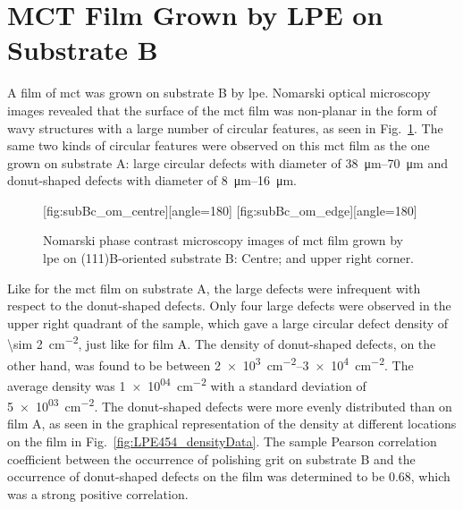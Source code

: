 \clearpage
\section{MCT Film Grown by LPE on Substrate B}\label{sec:subBc}

A film of \ac{mct} was grown on substrate B by \ac{lpe}. Nomarski optical microscopy images revealed that the surface of the \ac{mct} film was non-planar in the form of wavy structures with a large number of circular features, as seen in Fig.~\ref{fig:subBc_om}. The same two kinds of circular features were observed on this \ac{mct} film as the one grown on substrate A: large circular defects with diameter of \SIrange{38}{70}{\micro\metre} and donut-shaped defects with diameter of \SIrange{8}{16}{\micro\metre}.

\begin{figure}[htbp]
    \centering
    [fig:subBc_om_centre][angle=180]
    \hfill
    [fig:subBc_om_edge][angle=180]
    \caption[Nomarski phase contrast microscopy images of \ac{mct} film grown by \ac{lpe} on substrate B.]{Nomarski phase contrast microscopy images of \ac{mct} film grown by \ac{lpe} on (111)B-oriented substrate B:  Centre; and  upper right corner.}
    \label{fig:subBc_om}
\end{figure}


Like for the \ac{mct} film on substrate A, the large defects were infrequent with respect to the donut-shaped defects. Only four large defects were observed in the upper right quadrant of the sample, which gave a large circular defect density of \SI{\sim 2}{\centi\metre^{-2}}, just like for film A. The density of donut-shaped defects, on the other hand, was found to be between \SIrange{2e+3}{3e+4}{\centi\metre^{-2}}. The average density was \SI{1e+04}{\centi\metre^{-2}} with a standard deviation of \SI{5e+03}{\centi\metre^{-2}}. The donut-shaped defects were more evenly distributed than on film A, as seen in the graphical representation of the density at different locations on the film in Fig.~\ref{fig:LPE454_densityData}. The sample Pearson correlation coefficient between the occurrence of polishing grit on substrate B and the occurrence of donut-shaped defects on the film was determined to be \SI{+0.68}{}, which was a strong positive correlation. 

